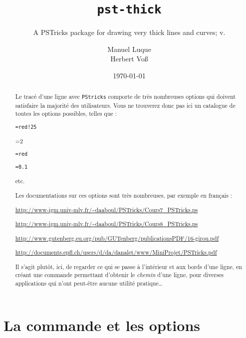 \documentclass[11pt,english,french,BCOR10mm,DIV12,bibliography=totoc,parskip=false,smallheadings
    headexclude,footexclude,oneside]{pst-doc}
\let\pstFV\fileversion
\begin{document}
\title{\texttt{pst-thick}}
\subtitle{A PSTricks package for drawing very thick lines and curves; v.\pstFV}
\author{Manuel Luque \\Herbert Vo\ss}
\date{\today}
\maketitle

\clearpage

\begin{abstract}
Le tracé d'une ligne avec \texttt{PStricks} comporte de très nombreuses options qui doivent satisfaire la majorité des
utilisateurs. Vous ne trouverez donc pas ici un catalogue de toutes les options possibles, telles que :
\begin{compactitem}
  \item {}\texttt{=red!25}
  \item {}=2
  \item {}\texttt{=red}
  \item {}\texttt{=0.1}
  \item etc.
\end{compactitem}
Les documentations sur ces options sont très nombreuses, par exemple en français :
\begin{compactitem}
  \item \url{http://www-igm.univ-mlv.fr/~daaboul/PSTricks/Cours7_PSTricks.ps}
  \item \url{http://www-igm.univ-mlv.fr/~daaboul/PSTricks/Cours8_PSTricks.ps}
  \item \url{http://www.gutenberg.eu.org/pub/GUTenberg/publicationsPDF/16-girou.pdf}
  \item \url{http://documents.epfl.ch/users/d/da/danalet/www/MiniProjet/PSTricks.pdf}
\end{compactitem}
Il s'agit plutôt, ici, de regarder ce qui se passe à l'intérieur et aux bords d'une ligne, en créant une commande permettant d'obtenir
le \textit{chemin} d'une ligne, pour diverses applications qui n'ont peut-être aucune utilité pratique\ldots
\end{abstract}

\tableofcontents

\clearpage

\section{La commande et les options}
\end{document}
